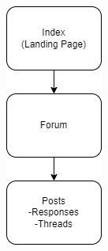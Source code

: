 \documentclass{article}
\begin{document}
\includegraphics[width=\linewidth]{Structure.jpg}
\end{document}
